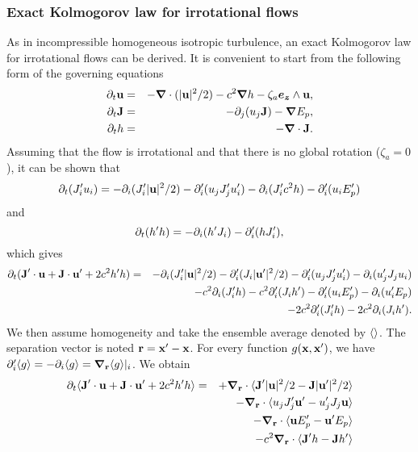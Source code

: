\subsubsection{Exact Kolmogorov law for irrotational flows}



As in incompressible homogeneous isotropic turbulence, an exact
Kolmogorov law for irrotational flows can be derived.
%
It is convenient to start from the following form of the governing
equations
\begin{eqnarray}
\partial_t \textbf{u} &=& -\boldsymbol{\nabla} \cdot (|\textbf{u}|^2/2) - c^2 \boldsymbol{\nabla} h  
- \zeta_a \boldsymbol{e_z} \wedge \textbf{u}, \\
\partial_t \textbf{J} &=& -\partial_j (u_j \textbf{J}) - \boldsymbol{\nabla} E_p,\\
\partial_t h   &=& -\boldsymbol{\nabla} \cdot \textbf{J}.
\end{eqnarray}
Assuming that the flow is irrotational and that there is no global
rotation ($\zeta_a=0$), it can be shown that
\begin{equation}
\partial_t ( J_i' u_i ) = - \partial_i( J_i'|\textbf{u}|^2/2) - \partial_i'(u_j J_j' u_i')
-\partial_i (J_i' c^2 h)  - \partial_i' (u_i E_p')
\end{equation}
and
\begin{equation}
\partial_t ( h' h ) = - \partial_i( h'J_i ) - \partial_i'( hJ_i' ),
\end{equation}
which gives
\begin{eqnarray}
\p_t ( \JJ'\cdot\uu + \JJ\cdot\uu' + 2c^2 h'h )
&=& - \p_i( J_i'|\uu|^2/2) - \p_i'( J_i|\uu'|^2/2) %
- \p_i'(u_j J_j' u_i') - \p_i(u_j' J_j u_i) \nonumber\\
&& -c^2\p_i (J_i'h) - c^2\p_i' (J_ih') %
- \p_i' (u_i E_p') - \p_i (u_i' E_p) \nonumber\\
&& -2c^2\p_i' (J_i'h) - 2c^2\p_i (J_ih').
\end{eqnarray}
We then assume homogeneity and take the ensemble average denoted by
$\langle  \rangle$.  The separation vector is noted $\textbf{r} = \textbf{x}' - \textbf{x}$.  For
every function $g(\textbf{x}, \textbf{x}')$, we have $\partial_i' \langle g \rangle =
-\partial_i\langle g \rangle = \boldsymbol{\nabla}_{\textbf{r}} \langle g \rangle|_i$. We obtain
\begin{eqnarray}
\partial_t \langle  \textbf{J}'\cdot\textbf{u} + \textbf{J}\cdot\textbf{u}' + 2c^2 h'h  \rangle
&=& + \boldsymbol{\nabla}_{\textbf{r}}\cdot\langle  \textbf{J}'|\textbf{u}|^2/2 - \textbf{J}|\textbf{u}'|^2/2  \rangle \nonumber\\
&& - \boldsymbol{\nabla}_{\textbf{r}}\cdot\langle  u_j J_j' \textbf{u}' - u_j' J_j \textbf{u}  \rangle \nonumber\\
&& - \boldsymbol{\nabla}_{\textbf{r}}\cdot\langle  \textbf{u} E_p'- \textbf{u}' E_p  \rangle \nonumber\\
&& -c^2\boldsymbol{\nabla}_{\textbf{r}}\cdot\langle  \textbf{J}'h - \textbf{J} h'  \rangle
\end{eqnarray}

